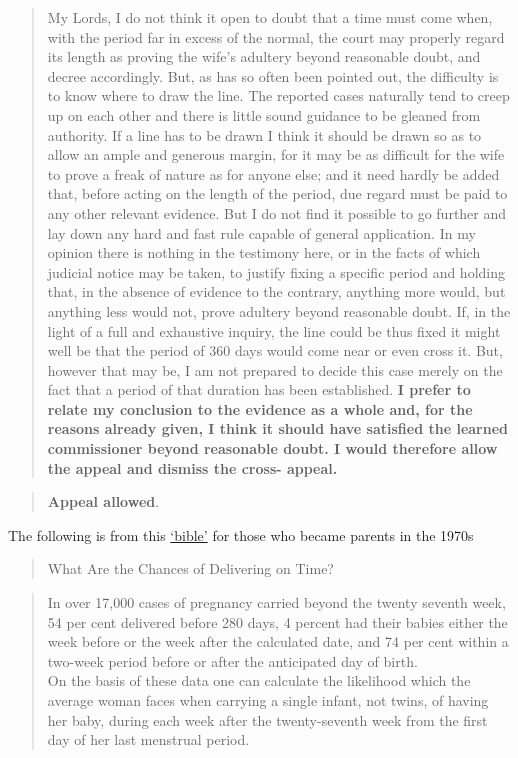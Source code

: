 \documentclass[]{book}
\begin{document}
\begin{quote}
My Lords, I do not think it open to doubt that a time must come when, with the period far in excess of the normal, the court may properly regard its length as proving the wife's adultery beyond reasonable doubt, and decree accordingly. But, as has so often been pointed out, the difficulty is to know where to draw the line. The reported cases naturally tend to creep up on each other and there is little sound guidance to be gleaned from authority. If a line has to be drawn I think it should be drawn so as to allow an ample and generous margin, for it may be as difficult for the wife to prove a freak of nature as for anyone else; and it need hardly be added that, before acting on the length of the period, due regard must be paid to any other relevant evidence. But I do not find it possible to go further and lay down any hard and fast rule capable of general application. In my opinion there is nothing in the testimony here, or in the facts of which judicial notice may be taken, to justify fixing a specific period and holding that, in the absence of evidence to the contrary, anything more would, but anything less would not, prove adultery beyond reasonable doubt. If, in the light of a full and exhaustive inquiry, the line could be thus fixed it might well be that the period of 360 days would come near or even cross it. But, however that may be, I am not prepared to decide this case merely on the fact that a period of that duration has been established. \textbf{I prefer to relate my conclusion to the evidence as a whole and, for the reasons already given, I think it should have satisfied the learned commissioner beyond reasonable doubt.
I would therefore allow the appeal and
dismiss the cross- appeal.}
\end{quote}

\begin{quote}
\textbf{Appeal allowed}.
\end{quote}

The following is from this \href{http://www.biostat.mcgill.ca/hanley/statbook/Guttmacher.pdf}{`bible'} for those who became parents in the 1970s

\begin{quote}
What Are the Chances of Delivering on Time?
\end{quote}

\begin{quote}
In over 17,000 cases of pregnancy carried beyond the twenty seventh week, 54 per cent delivered before 280 days, 4 percent had their babies either the week before or the week after the calculated date, and 74 per cent within a two-week period before or after the anticipated day of birth.\\
On the basis of these data one can calculate the likelihood
which the average woman faces when carrying a single infant,
not twins, of having her baby, during each week after the
twenty-seventh week from the first day of her last menstrual
period.
\end{quote}
\end{document}
